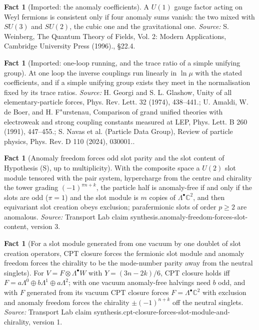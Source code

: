 \documentclass[11pt]{article}
\theoremstyle{definition}
\newtheorem{fact}[theorem]{Fact}
\theoremstyle{plain}
\providecommand{\C}{}\renewcommand{\C}{\mathbb{C}}
\begin{document}
\begin{fact}[Imported: the anomaly coefficients]\label{c:standard-model.imported-anomaly-coefficients}
A $U(1)$ gauge factor acting on Weyl fermions is consistent only if four anomaly sums vanish: the two mixed with $SU(3)$ and $SU(2)$, the cubic one and the gravitational one.
\emph{Source:} S. Weinberg, The Quantum Theory of Fields, Vol. 2: Modern Applications, Cambridge University Press (1996)., \S 22.4.
\end{fact}

\begin{fact}[Imported: one-loop running, and the trace ratio of a simple unifying group]\label{c:standard-model.imported-one-loop-running-trace-ratio}
At one loop the inverse couplings run linearly in $\ln\mu$ with the stated coefficients, and if a simple unifying group exists they meet in the normalisation fixed by its trace ratios.
\emph{Source:} H. Georgi and S. L. Glashow, Unity of all elementary-particle forces, Phys. Rev. Lett. 32 (1974), 438--441.; U. Amaldi, W. de Boer, and H. F"urstenau, Comparison of grand unified theories with electroweak and strong coupling constants measured at LEP, Phys. Lett. B 260 (1991), 447--455.; S. Navas et al. (Particle Data Group), Review of particle physics, Phys. Rev. D 110 (2024), 030001..
\end{fact}

\begin{fact}[Anomaly freedom forces odd slot parity and the slot content of Hypothesis (S), up to multiplicity]\label{c:synthesis.anomaly-freedom-forces-slot-content}
With the composite space a $U(2)$ slot module tensored with the pair system, hypercharge from the centre and chirality the tower grading $(-1)^{\pi n + k}$, the particle half is anomaly-free if and only if the slots are odd ($\pi = 1$) and the slot module is $m$ copies of $\Lambda^{\bullet}\C^{2}$, and then equivariant slot creation obeys exclusion; parafermionic slots of order $p \ge 2$ are anomalous.
\emph{Source:} Transport Lab claim synthesis.anomaly-freedom-forces-slot-content, version 3.
\end{fact}

\begin{fact}[For a slot module generated from one vacuum by one doublet of slot creation operators, CPT closure forces the fermionic slot module and anomaly freedom forces the chirality to be the mode-number parity away from the neutral singlets]\label{c:synthesis.cpt-closure-forces-slot-module-and-chirality}
For $V = F \otimes \Lambda^{\bullet}W$ with $Y = (3n - 2k)/6$, CPT closure holds iff $F = a\Lambda^{0} \oplus b\Lambda^{1} \oplus a\Lambda^{2}$; with one vacuum anomaly-free halvings need $b$ odd, and with $F$ generated from its vacuum CPT closure forces $F = \Lambda^{\bullet}\C^{2}$ with exclusion and anomaly freedom forces the chirality $\pm(-1)^{n + k}$ off the neutral singlets.
\emph{Source:} Transport Lab claim synthesis.cpt-closure-forces-slot-module-and-chirality, version 1.
\end{fact}
\end{document}
